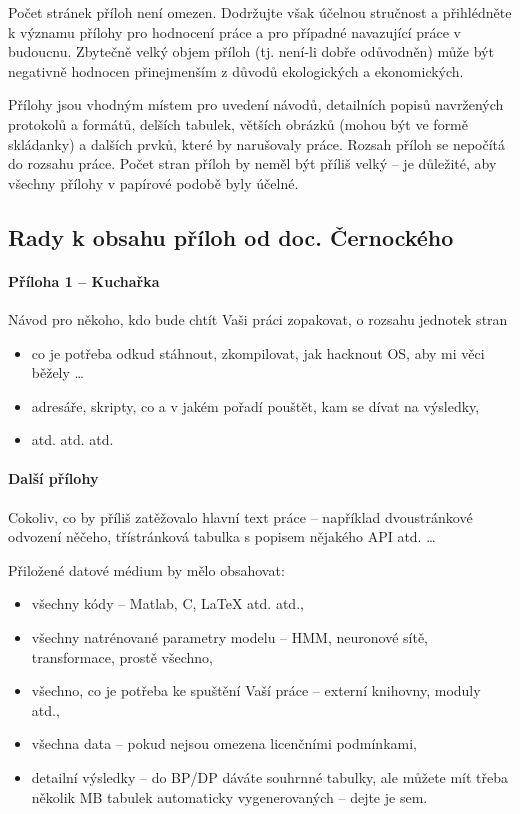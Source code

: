 Počet stránek příloh není omezen. Dodržujte však účelnou stručnost a přihlédněte k významu přílohy pro hodnocení práce a pro případné navazující práce v budoucnu. Zbytečně velký objem příloh (tj. není-li dobře odůvodněn) může být negativně hodnocen přinejmenším z důvodů ekologických a ekonomických. \cite{fitWeb}

Přílohy jsou vhodným místem pro uvedení návodů, detailních popisů navržených protokolů a formátů, delších tabulek, větších obrázků (mohou být ve formě skládanky) a dalších prvků, které by narušovaly  práce. Rozsah příloh se nepočítá do rozsahu práce. Počet stran příloh by neměl být příliš velký -- je důležité, aby všechny přílohy v papírové podobě byly účelné.

\subsection*{Rady k obsahu příloh od doc. Černockého}

\paragraph{Příloha 1 -- Kuchařka}

Návod pro někoho, kdo bude chtít Vaši práci zopakovat, o rozsahu jednotek stran
\begin{itemize}
  \item{co je potřeba odkud stáhnout, zkompilovat, jak hacknout OS, aby mi věci běžely \ldots}
  \item{adresáře, skripty, co a v jakém pořadí pouštět, kam se dívat na výsledky,}
  \item{atd. atd. atd.}
\end{itemize}

\paragraph{Další přílohy}

Cokoliv, co by příliš zatěžovalo hlavní text práce -- například dvoustránkové odvození něčeho, třístránková tabulka s popisem nějakého API atd. \ldots

Přiložené datové médium by mělo obsahovat:
\begin{itemize}
  \item{všechny kódy -- Matlab, C, \LaTeX{} atd. atd.,}
  \item{všechny natrénované parametry modelu -- HMM, neuronové sítě, transformace, prostě všechno,}
  \item{všechno, co je potřeba ke spuštění Vaší práce -- externí knihovny, moduly atd.,}
  \item{všechna data -- pokud nejsou omezena licenčními podmínkami,}
  \item{detailní výsledky -- do BP/DP dáváte souhrnné tabulky, ale můžete mít třeba několik MB tabulek automaticky vygenerovaných -- dejte je sem.}
\end{itemize}

